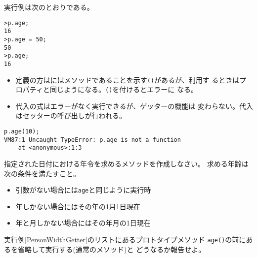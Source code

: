  実行例は次のとおりである。
\begin{Verbatim}
>p.age;
16
>p.age = 50;
50
>p.age;
16
\end{Verbatim}
\begin{itemize}
 \item 定義の方はにはメソッドであることを示す\texttt{()}があるが、利用す
       るときはプロパティと同じようになる。\texttt{()}を付けるとエラーに
       なる。
 \item 代入の式はエラーがなく実行できるが、ゲッターの機能は
       変わらない。代入はセッターの呼び出しが行われる。
\end{itemize}
\begin{Verbatim}
p.age(10);
VM87:1 Uncaught TypeError: p.age is not a function
    at <anonymous>:1:3
\end{Verbatim}
\begin{Prob}\upshape
 指定された日付における年令を求めるメソッドを作成しなさい。
 求める年齢は次の条件を満たすこと。
 \begin{itemize}
  \item 引数がない場合には\texttt{age}と同じように実行時
  \item 年しかない場合にはその年の1月1日現在
  \item 年と月しかない場合にはその年月の1日現在
 \end{itemize}
\end{Prob}
\begin{Prob}\upshape
実行例\ref{PersonWidthGetter}のリストにあるプロトタイプメソッド
 \texttt{age()}の前にあるを省略して実行する(通常のメソッド)と
 どうなるか報告せよ。
\end{Prob}
